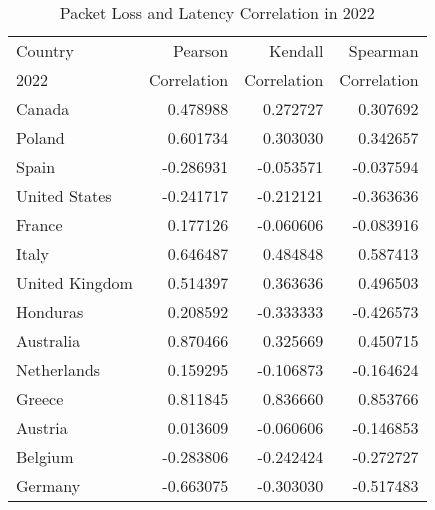 \begin{table}
	\footnotesize
	\caption{Packet Loss and Latency Correlation in 2022}
	\label{fig:packetloss-latency-correlation-2022}
	\begin{tabular}{lrrr}
		\toprule
		Country        & Pearson     & Kendall     & Spearman    \\
		2022           & Correlation & Correlation & Correlation \\
		\midrule
		Canada         & 0.478988    & 0.272727    & 0.307692    \\
		Poland         & 0.601734    & 0.303030    & 0.342657    \\
		Spain          & -0.286931   & -0.053571   & -0.037594   \\
		United States  & -0.241717   & -0.212121   & -0.363636   \\
		France         & 0.177126    & -0.060606   & -0.083916   \\
		Italy          & 0.646487    & 0.484848    & 0.587413    \\
		United Kingdom & 0.514397    & 0.363636    & 0.496503    \\
		Honduras       & 0.208592    & -0.333333   & -0.426573   \\
		Australia      & 0.870466    & 0.325669    & 0.450715    \\
		Netherlands    & 0.159295    & -0.106873   & -0.164624   \\
		Greece         & 0.811845    & 0.836660    & 0.853766    \\
		Austria        & 0.013609    & -0.060606   & -0.146853   \\
		Belgium        & -0.283806   & -0.242424   & -0.272727   \\
		Germany        & -0.663075   & -0.303030   & -0.517483   \\
		\bottomrule
	\end{tabular}
\end{table}

